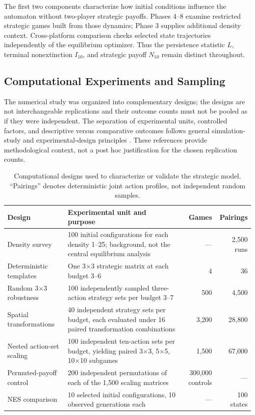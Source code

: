 \documentclass[games,article,submit,moreauthors]{Definitions/mdpi}
\begin{document}
The first two components characterize how initial conditions influence the automaton without two-player strategic payoffs. Phases 4--8 examine restricted strategic games built from those dynamics; Phase 3 supplies additional density context. Cross-platform comparison checks selected state trajectories independently of the equilibrium optimizer. Thus the persistence statistic $L$, terminal nonextinction $I_{10}$, and strategic payoff $N_{10}$ remain distinct throughout.

\subsection{Computational Experiments and Sampling}\label{sec:phases}

The numerical study was organized into complementary designs; the designs are not interchangeable replications and their outcome counts must not be pooled as if they were independent. The separation of experimental units, controlled factors, and descriptive versus comparative outcomes follows general simulation-study and experimental-design principles \citep{law2015simulation,montgomery2017design}. These references provide methodological context, not a post hoc justification for the chosen replication counts.

\begin{table}[H]
\centering
\caption{Computational designs used to characterize or validate the strategic model. ``Pairings'' denotes deterministic joint action profiles, not independent random samples.}\label{tab:designs}
\begin{tabularx}{\linewidth}{@{}lXrr@{}}
\toprule
\textbf{Design} & \textbf{Experimental unit and purpose} & \textbf{Games} & \textbf{Pairings}\\
\midrule
Density survey & 100 initial configurations for each density 1--25; background, not the central equilibrium analysis & --- & 2,500 runs\\
Deterministic templates & One 3$\times$3 strategic matrix at each budget 3--6 & 4 & 36\\
Random 3$\times$3 robustness & 100 independently sampled three-action strategy sets per budget 3--7 & 500 & 4,500\\
Spatial transformations & 40 independent strategy sets per budget, each evaluated under 16 paired transformation combinations & 3,200 & 28,800\\
Nested action-set scaling & 100 independent ten-action sets per budget, yielding paired 3$\times$3, 5$\times$5, 10$\times$10 subgames & 1,500 & 67,000\\
Permuted-payoff control & 200 independent permutations of each of the 1,500 scaling matrices & 300,000 controls & ---\\
NES comparison & 10 selected initial configurations, 10 observed generations each & --- & 100 states\\
\bottomrule
\end{tabularx}
\end{table}
\end{document}

